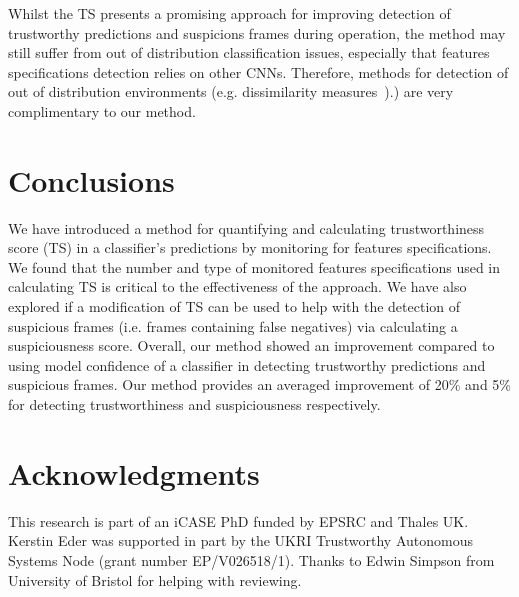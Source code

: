 Whilst the TS presents a promising approach for improving detection of trustworthy predictions and suspicions frames during operation, the method may still suffer from out of distribution classification issues, especially that features specifications detection relies on other CNNs.
%
Therefore, methods for detection of out of distribution environments (e.g. dissimilarity measures~\cite{Hond2020}).) are very complimentary to our method.

\section{Conclusions} \label{sec:conclusions} 
We have introduced a method for quantifying and calculating trustworthiness score (TS) in a classifier's predictions by monitoring for features specifications.
%
We found that the number and type of monitored features specifications used in calculating TS is critical to the effectiveness of the approach.
%
We have also explored if a modification of TS can be used to help with the detection of suspicious frames (i.e. frames containing false negatives) via calculating a suspiciousness score. 
%
Overall, our method showed an improvement compared to using model confidence of a classifier in detecting trustworthy predictions and suspicious frames. 
%
Our method provides an averaged improvement of 20\% and 5\% for detecting trustworthiness and suspiciousness respectively. 

\section*{Acknowledgments}
This research is part of an iCASE PhD funded by EPSRC and Thales UK. 
Kerstin Eder was supported in part by the UKRI Trustworthy Autonomous Systems Node (grant number EP/V026518/1).
%
Thanks to Edwin Simpson from University of Bristol for helping with reviewing.
